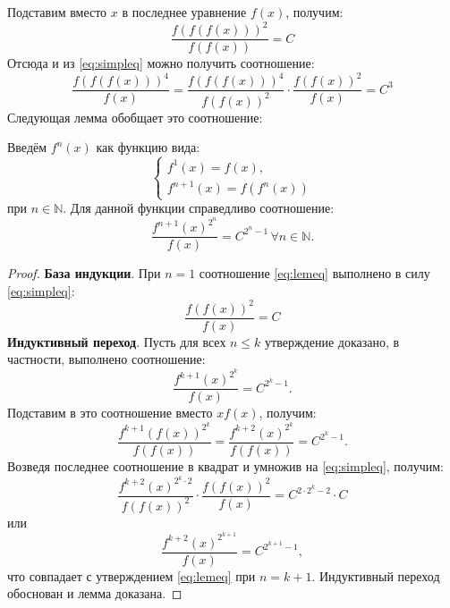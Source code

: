 \documentclass[11pt]{article}
\newcounter{lem}\setcounter{lem}{0}
\def\lm{\par\smallskip\refstepcounter{lem}\textbf{\arabic{lem}}}
\newtheorem*{Lemma}{Лемма \lm}
\newcounter{th}\setcounter{th}{0}
\begin{document}
Подставим вместо \(x\) в последнее уравнение \(f(x)\), получим:
\begin{equation*}
\frac{f(f(f(x)))^2}{f(f(x))} = C
\end{equation*}
Отсюда и из \eqref{eq:simpleq} можно получить соотношение:
\begin{equation*}
\frac{f(f(f(x)))^4}{f(x)} = \frac{f(f(f(x)))^4}{f(f(x))^2}\cdot\frac{f(f(x))^2}{f(x)} = C^3
\end{equation*}
Следующая лемма обобщает это соотношение:
\begin{Lemma}
Введём $f^n(x)$ как функцию вида:
\begin{equation*}
\begin{cases}
f^1(x) = f(x), \\
f^{n + 1}(x) = f(f^n(x))
\end{cases}
\end{equation*}
при $n \in \mathbb{N}$. Для данной функции справедливо соотношение:
\begin{equation}\label{eq:lemeq}
\frac{f^{n + 1}(x)^{2^n}}{f(x)} = C^{2^n - 1}\, \forall n \in \mathbb{N}.
\end{equation}
\end{Lemma}
\begin{proof}
\textbf{База индукции}. При $n = 1$ соотношение \eqref{eq:lemeq} выполнено в силу \eqref{eq:simpleq}:
\begin{equation*}
\frac{f(f(x))^2}{f(x)} = C
\end{equation*}
\textbf{Индуктивный переход}. Пусть для всех $n \leq k$ утверждение доказано, в частности, выполнено соотношение:
\begin{equation*}
\frac{f^{k + 1}(x)^{2^k}}{f(x)} = C^{2^k - 1}.
\end{equation*}
Подставим в это соотношение вместо $x f(x)$, получим:
\begin{equation*}
\frac{f^{k + 1}(f(x))^{2^k}}{f(f(x))} = \frac{f^{k + 2}(x)^{2^k}}{f(f(x))} = C^{2^k - 1}.
\end{equation*}
Возведя последнее соотношение в квадрат и умножив на \eqref{eq:simpleq}, получим:
\begin{equation*}
\frac{f^{k + 2}(x)^{2^{k}\cdot 2}}{f(f(x))^2}\cdot\frac{f(f(x))^2}{f(x)} = C^{2\cdot2^{k} - 2}\cdot C
\end{equation*}
или
\begin{equation*}
\frac{f^{k + 2}(x)^{2^{k + 1}}}{f(x)} = C^{2^{k + 1} - 1},
\end{equation*}
что совпадает с утверждением \eqref{eq:lemeq} при $n = k + 1$. Индуктивный переход обоснован и лемма доказана.
\end{proof}
\end{document}
